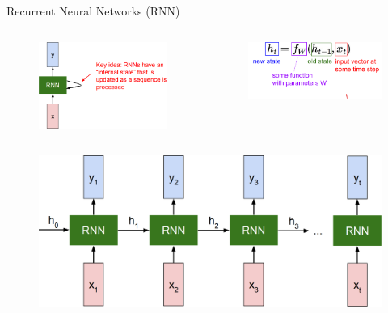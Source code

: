 \begin{frame}[allowframebreaks]{Recurrent Neural Networks (RNN)}
    \begin{columns}
    \begin{column}{0.5\textwidth}
        \begin{figure}
            \centering
            \includegraphics[width=1.05\textwidth,keepaspectratio]{images/rnn/slide_3_1_img.png}
        \end{figure}
    \end{column}
    \begin{column}{0.5\textwidth}
        \begin{figure}
            \centering
            \includegraphics[width=1.05\textwidth,keepaspectratio]{images/rnn/slide_3_2_img.png}
        \end{figure}
    \end{column}
    \end{columns}

    \framebreak

    \begin{figure}
        \centering
        \includegraphics[width=1.05\textwidth,keepaspectratio]{images/rnn/slide_4_1_img.png}
    \end{figure}


\end{frame}
